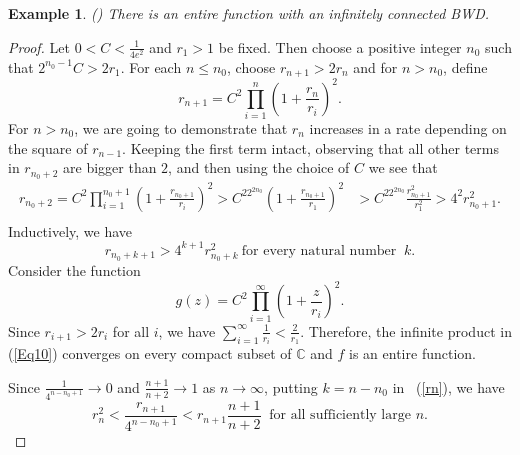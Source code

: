 \documentclass[11pt,a4paper]{article}
\newtheorem{example}{Example}[section]
\begin{document}
	\begin{example}(\cite{Baker 1985})
		There is an entire function with an infinitely connected BWD. \label{2nd exm}
	\end{example}
	\begin{proof}
	 
	Let $0<C<\frac{1}{4e^2}$ and $r_1>1$ be fixed. Then choose a positive integer $n_0$ such that $2^{n_0-1}C>2r_1$. For each $n\leq n_0$, choose $r_{n+1}>2r_n$ and for $n>n_0$, define 
	\begin{equation}\label{Eq9}
		r_{n+1}=C^2\prod_{i=1}^{n}\left(1+\frac{r_n}{r_i}\right)^2.
	\end{equation} For $n>n_0$, we are going to demonstrate that $r_n$ increases in a rate depending on the square of $r_{n-1}$. Keeping the first term intact, observing that all other terms in $r_{n_0 +2}$ are bigger than $2$, and then using the choice of $C$ we see that 
	\begin{align*}
		r_{n_0+2}=C^2\prod_{i=1}^{n_0+1}\left(1+\frac{r_{n_0+1}}{r_i}\right)^2 >C^22^{2n_0} \left(1+\frac{r_{n_0+1}}{r_1}\right)^2 
		&>C^22^{2n_0} \frac{r^2_{n_0+1}}{r^2_1} 
		 >{ 4}^2 r^2_{n_0+1}.\\
	\end{align*} 
	Inductively,  we have \begin{equation}r_{n_0+k+1}>{ 4 }^{k+1} r^2_{n_0+k}~\mbox{for every natural number }~k.\label{rn}\end{equation}
Consider  the function
	\begin{equation}\label{Eq10}
		g(z)=C^2\prod_{i=1}^{\infty}\left(1+\frac{z}{r_i}\right)^2.
	\end{equation} Since $r_{i+1}>2r_i$ for all $i$,  we have $\sum_{i=1}^{\infty}\frac{1}{r_i}<\frac{2}{r_1} $.  Therefore, the infinite product in (\ref{Eq10}) converges on every compact subset of $\mathbb{C}$ and $f$ is an entire function. 
	\par Since $\frac{1}{4^{n-n_0+1}}\to 0$ and $\frac{n+1}{n+2}\to 1$ as $n\to \infty$, putting $k =n-n_0$ in ~(\ref{rn}),  we have $$r^2_n<\frac{r_{n+1}}{4^{n-n_0+1}}<r_{n+1}\frac{n+1}{n+2}~\mbox{ for all sufficiently large  } n.$$
	

\end{proof}
\end{document}
